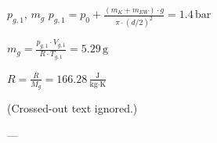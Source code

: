 \( p_{g,1} \), \( m_g \)  
\( p_{g,1} = p_0 + \frac{(m_K + m_{EW}) \cdot g}{\pi \cdot (d/2)^2} = 1.4 \, \text{bar} \)  

\( m_g = \frac{p_{g,1} \cdot V_{g,1}}{R \cdot T_{g,1}} = 5.29 \, \text{g} \)  

\( R = \frac{\bar{R}}{M_g} = 166.28 \, \frac{\text{J}}{\text{kg} \cdot \text{K}} \)  

(Crossed-out text ignored.)  

---